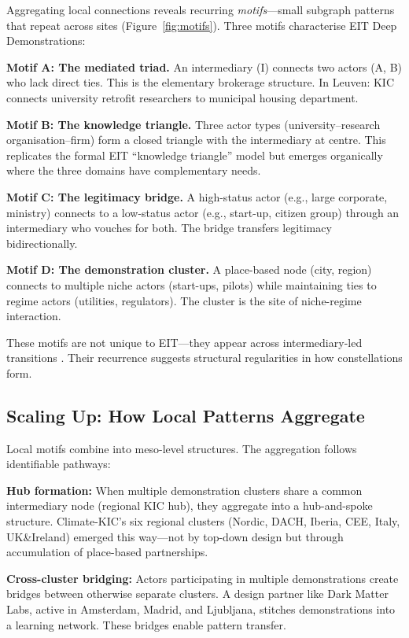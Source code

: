 Aggregating local connections reveals recurring \textit{motifs}---small subgraph patterns that repeat across sites (Figure~\ref{fig:motifs}). Three motifs characterise EIT Deep Demonstrations:

\textbf{Motif A: The mediated triad.} An intermediary (I) connects two actors (A, B) who lack direct ties. This is the elementary brokerage structure. In Leuven: KIC connects university retrofit researchers to municipal housing department.

\textbf{Motif B: The knowledge triangle.} Three actor types (university--research organisation--firm) form a closed triangle with the intermediary at centre. This replicates the formal EIT ``knowledge triangle'' model but emerges organically where the three domains have complementary needs.

\textbf{Motif C: The legitimacy bridge.} A high-status actor (e.g., large corporate, ministry) connects to a low-status actor (e.g., start-up, citizen group) through an intermediary who vouches for both. The bridge transfers legitimacy bidirectionally.

\textbf{Motif D: The demonstration cluster.} A place-based node (city, region) connects to multiple niche actors (start-ups, pilots) while maintaining ties to regime actors (utilities, regulators). The cluster is the site of niche-regime interaction.

These motifs are not unique to EIT---they appear across intermediary-led transitions \citep{kivimaa2019typology}. Their recurrence suggests structural regularities in how constellations form.

\subsection{Scaling Up: How Local Patterns Aggregate}

Local motifs combine into meso-level structures. The aggregation follows identifiable pathways:

\textbf{Hub formation:} When multiple demonstration clusters share a common intermediary node (regional KIC hub), they aggregate into a hub-and-spoke structure. Climate-KIC's six regional clusters (Nordic, DACH, Iberia, CEE, Italy, UK\&Ireland) emerged this way---not by top-down design but through accumulation of place-based partnerships.

\textbf{Cross-cluster bridging:} Actors participating in multiple demonstrations create bridges between otherwise separate clusters. A design partner like Dark Matter Labs, active in Amsterdam, Madrid, and Ljubljana, stitches demonstrations into a learning network. These bridges enable pattern transfer.

